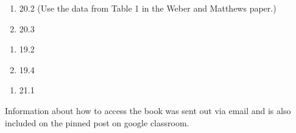 \documentclass[12pt]{article}
\begin{document}
\begin{enumerate}
\setlength{\itemsep}{-1mm}
\item 20.2 (Use the data from Table 1 in the Weber and Matthews paper.)
\item 20.3
\end{enumerate}

\begin{enumerate}
\setlength{\itemsep}{-1mm}
\item 19.2 
\item 19.4
\end{enumerate}

\begin{enumerate}
\setlength{\itemsep}{-1mm}
\item 21.1
\end{enumerate}


\noindent Information about how to access the book was sent out
via email and is also included on the pinned post on google
classroom. 
\end{document}
